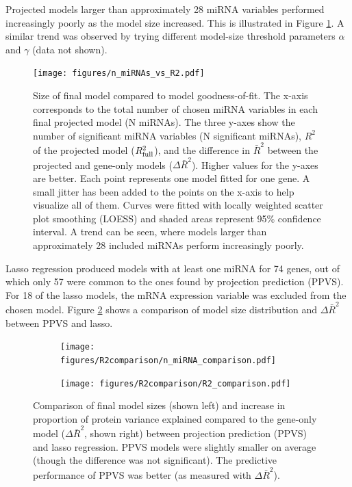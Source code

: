 Projected models larger than approximately 28 miRNA variables performed
increasingly poorly as the model size increased. This is illustrated in Figure
\ref{fig:n-miRNAs-vs-R2}. A similar trend was observed by trying different
model-size threshold parameters $\alpha$ and $\gamma$ (data not shown).

\begin{figure}[!h]
  \centering
  \texttt{[image: figures/n\_miRNAs\_vs\_R2.pdf]}
  \caption{Size of final model compared to model goodness-of-fit. The x-axis corresponds to
  the total number of chosen miRNA variables in each final projected model (N miRNAs).
  The three y-axes show the number of significant miRNA variables (N significant miRNAs),
  $R^2$ of the projected model ($R_{\textup{full}}^2$), and the
  difference in $\bar{R}^2$ between the projected and gene-only models
  ($\Delta\bar{R}^2$). Higher values for the y-axes are better.
  Each point represents one model fitted for one gene. A
  small jitter has been added to the points on the x-axis to help visualize all of them.
  Curves were fitted with locally weighted scatter plot smoothing (LOESS) and
  shaded areas represent 95\% confidence interval. A trend can be seen, where
  models larger than approximately 28 included miRNAs perform increasingly poorly.}
  \label{fig:n-miRNAs-vs-R2}
\end{figure}

Lasso regression produced models with at least one miRNA for 74 genes, out of
which only 57 were common to the ones found by projection prediction (PPVS).
For 18 of the lasso models, the mRNA expression variable was excluded from
the chosen model.
Figure \ref{fig:model-size} shows a comparison of model size distribution
and $\Delta\bar{R}^2$ between PPVS and lasso.

\begin{figure}[!h]
  \centering
  \begin{subfigure}{.45\textwidth}
    \texttt{[image: figures/R2comparison/n\_miRNA\_comparison.pdf]}
  \end{subfigure}
  \begin{subfigure}{.45\textwidth}
    \texttt{[image: figures/R2comparison/R2\_comparison.pdf]}
  \end{subfigure}

  \caption{Comparison of final model sizes (shown left) and 
      increase in proportion of protein variance explained
      compared to the gene-only model ($\Delta\bar{R}^2$, shown right) between
      projection prediction (PPVS) and lasso regression. PPVS models were slightly
      smaller on average (though the difference was not significant). The predictive
      performance of PPVS was better (as measured with $\Delta\bar{R}^2$).}
  \label{fig:model-size}
\end{figure}





